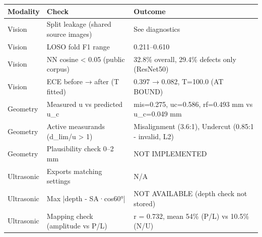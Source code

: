 \begin{tabular}{lll}
\toprule
Modality & Check & Outcome \\
\midrule
Vision & Split leakage (shared source images) & See diagnostics \\
Vision & LOSO fold F1 range & 0.211--0.610 \\
Vision & NN cosine < 0.05 (public corpus) & 32.8\% overall, 29.4\% defects only (ResNet50) \\
Vision & ECE before → after (T fitted) & 0.397 → 0.082, T=100.0 (AT BOUND) \\
Geometry & Measured u vs predicted u_c & mis=0.275, uc=0.586, rf=0.493 mm vs u_c=0.049 mm \\
Geometry & Active measurands (d_lim/u > 1) & Misalignment (3.6:1), Undercut (0.85:1 - invalid, L2) \\
Geometry & Plausibility check 0--2 mm & NOT IMPLEMENTED \\
Ultrasonic & Exports matching settings & N/A \\
Ultrasonic & Max |depth - SA·cos60°| & NOT AVAILABLE (depth check not stored) \\
Ultrasonic & Mapping check (amplitude vs P/L) & r = 0.732, mean 54\% (P/L) vs 10.5\% (N/U) \\
\bottomrule
\end{tabular}
